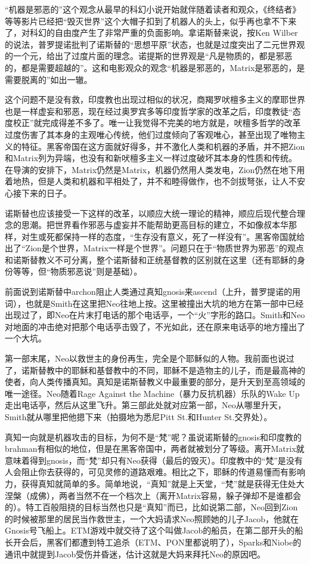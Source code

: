 \documentclass[UTF8]{ctexart}
\begin{document}
“机器是邪恶的”这个观念从最早的科幻小说开始就伴随着读者和观众，《终结者》等等影片已经把“毁灭世界”这个大帽子扣到了机器人的头上，似乎再也拿不下来了，对科幻的自由度产生了非常严重的负面影响。拿诺斯替来说，按Ken Wilber的说法，普罗提诺批判了诺斯替的“思想平原”状态，也就是过度突出了二元世界观的一个元，给出了过度片面的理念。诺提斯的世界观是“凡是物质的，都是邪恶的，都是需要超越的”。这和电影观众的观念“机器是邪恶的，Matrix是邪恶的，是需要脱离的”如出一辙。

这个问题不是没有救，印度教也出现过相似的状况，商羯罗吠檀多主义的摩耶世界也是一样虚妄和邪恶，现在经过奥罗宾多等印度哲学家的改革之后，印度教徒“态度校正”就完成得差不多了。唯一让我觉得不完美的地方就是，吠檀多哲学的改革过度伤害了其本身的主观唯心传统，他们过度倾向了客观唯心，甚至出现了唯物主义的特征。黑客帝国在这方面就好得多，并不激化人类和机器的矛盾，并不把Zion和Matrix列为异端，也没有和新吠檀多主义一样过度破坏其本身的性质和传统。在导演的安排下，Matrix仍然是Matrix，机器仍然用人类发电，Zion仍然在地下用着地热，但是人类和机器和平相处了，并不和睦得做作，也不剑拔弩张，让人不安心接下来的日子。

诺斯替也应该接受一下这样的改革，以顺应大统一理论的精神，顺应后现代整合理念的思潮。把世界看作邪恶与虚妄并不能帮助更高目标的建立，不如像叔本华那样，对生或死都保持一样的态度，“生存没有意义，死了一样没有”。黑客帝国就给出了“Zion是个世界，Matrix一样是个世界”。问题只在于“物质世界为邪恶”的观点和诺斯替教义不可分离，整个诺斯替和正统基督教的区别就在这里（还有耶稣的身份等等，但“物质邪恶说”则是基础）。

前面说到诺斯替中archon阻止人类通过真知gnosis来ascend（上升，普罗提诺的用词），也就是Smith在这里把Neo往地上按。这里被撞出大坑的地方在第一部中已经出现过了，即Neo在片末打电话的那个电话亭，一个“火”字形的路口。Smith和Neo对地面的冲击绝对把那个电话亭击毁了，不光如此，还在原来电话亭的地方撞出了一个大坑。

第一部末尾，Neo以救世主的身份再生，完全是个耶稣似的人物。我前面也说过了，诺斯替教中的耶稣和基督教中的不同，耶稣不是造物主的儿子，而是最高神的使者，向人类传播真知。真知是诺斯替教义中最重要的部分，是升天到至高领域的唯一途径。Neo随着Rage Against the Machine（暴力反抗机器）乐队的Wake Up走出电话亭，然后从这里飞升。第三部此处就对应第一部，Neo从哪里升天，Smith就从哪里把他摁下来（拍摄地为悉尼Pitt St.和Hunter St.交界处）。

真知一向就是机器攻击的目标，为何不是“梵”呢？虽说诺斯替的gnosis和印度教的brahman有相似的地位，但是在黑客帝国中，两者就被划分了等级。离开Matrix就意味着得到gnosis，而“梵”却只有Neo获得（最后的毁灭）。印度教中的“梵”是没有人会阻止你去获得的，可见灵修的道路艰难。相比之下，耶稣的传道易懂而有影响力，获得真知就简单的多。简单地说，“真知”就是上天堂，“梵”就是获得无住处大涅槃（成佛），两者当然不在一个档次上（离开Matrix容易，躲子弹却不是谁都会的）。特工百般阻挠的目标当然也只是“真知”而已，比如说第二部，Neo回到Zion的时候被那里的居民当作救世主，一个大妈请求Neo照顾她的儿子Jacob，他就在Gnosis号飞船上。ETM游戏中就交待了这个叫做Jacob的船员，在第二部开头的船长开会后，黑客们都遭到特工追杀（ETM、PON里都说明了），Sparks和Niobe的通讯中就提到Jacob受伤并昏迷，估计这就是大妈来拜托Neo的原因吧。
\end{document}
